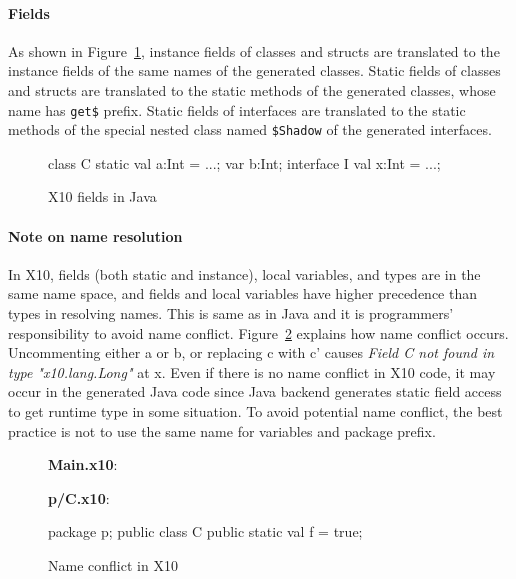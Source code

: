 \paragraph{Fields}

As shown in Figure~\ref{fig:fields}, instance fields of \Xten{} classes and structs are translated to the instance fields of the same names of the generated \Java{} classes.
Static fields of \Xten{} classes and structs are translated to the static methods of the generated \Java{} classes, whose name has \verb|get$| prefix.
Static fields of \Xten{} interfaces are translated to the static methods of the special nested class named \verb|$Shadow| of the generated \Java{} interfaces.

\begin{figure}
\begin{xten}
class C {
  static val a:Int = ...;
  var b:Int;
}
interface I {
  val x:Int = ...;
}
\end{xten}
\caption{X10 fields in Java}
\label{fig:fields}
\end{figure}


\paragraph{Note on name resolution}
In X10, fields (both static and instance), local variables, and types are in the same name space, and fields and local variables have higher precedence than types in resolving names. This is same as in Java and it is programmers' responsibility to avoid name conflict. Figure~\ref{fig:nameconflict} explains how name conflict occurs. Uncommenting either a or b, or replacing c with c' causes {\em Field C not found in type "x10.lang.Long"} at x.
Even if there is no name conflict in X10 code, it may occur in the generated Java code since Java backend generates static field access to get runtime type in some situation.
To avoid potential name conflict, the best practice is not to use the same name for variables and package prefix.

\begin{figure}
{\bf Main.x10}: 
\begin{xten}
public class Main {
  //static val p:Long = 1; // a
  //val p:Long = 1;        // b
  //def func(p:Long) {     // c'
  def func() {             // c
    val f = p.C.f;         // x
  }
}
\end{xten}
{\bf p/C.x10}: 
\begin{xten}
package p;
public class C {
  public static val f = true;
}
\end{xten}
\caption{Name conflict in X10}
\label{fig:nameconflict}
\end{figure}


